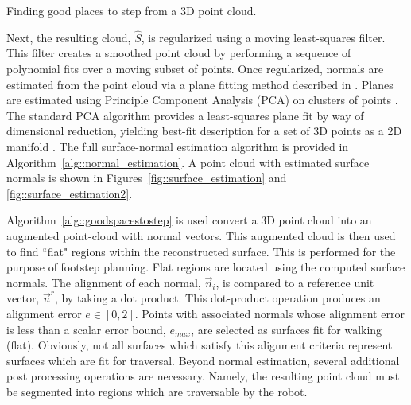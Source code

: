 			\begin{algorithm}
				\begin{algorithmic}
						\EndIf
					\EndFor
				\end{algorithmic}	
				\caption{Finding good places to step from a 3D point cloud.}
				\label{alg::goodspacestostep}
			\end{algorithm}

			Next, the resulting cloud, $\hat{S}$, is regularized using a moving least-squares filter. This filter creates a smoothed point cloud by performing a sequence of polynomial fits over a moving subset of points. Once regularized, normals are estimated from the point cloud via a plane fitting method described in \cite{Mitra2003}. Planes are estimated using Principle Component Analysis (PCA) on clusters of points \cite{Castillo2013}. The standard PCA algorithm provides a least-squares plane fit by way of dimensional reduction, yielding best-fit description for a set of 3D points as a 2D manifold \cite{Pearson1901}. The full surface-normal estimation algorithm is provided in Algorithm~\ref{alg::normal_estimation}. A point cloud with estimated surface normals is shown in Figures~\ref{fig::surface_estimation} and \ref{fig::surface_estimation2}.

			Algorithm~\ref{alg::goodspacestostep} is used convert a 3D point cloud into an augmented point-cloud with normal vectors. This augmented cloud is then used to find ``flat" regions within the reconstructed surface. This is performed for the purpose of footstep planning. Flat regions are located using the computed surface normals. The alignment of each \Ith normal, $\vec{n}_{i}$, is compared to a reference unit vector, $\vec{u}^{r}$, by taking a dot product. This dot-product operation produces an alignment error $e\in[0,2]$. Points with associated normals whose alignment error is less than a scalar error bound, $e_{max}$, are selected as surfaces fit for walking (\IE flat). Obviously, not all surfaces which satisfy this alignment criteria represent surfaces which are fit for traversal. Beyond normal estimation, several additional post processing operations are necessary. Namely, the resulting point cloud must be segmented into regions which are traversable by the robot.

